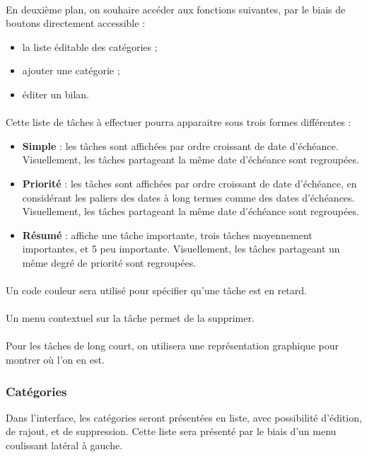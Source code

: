 \documentclass{article}
\begin{document}
			\paragraph{}
			En deuxième plan, on souhaire accéder aux fonctions suivantes, par le biais de boutons directement accessible :
			\begin{itemize}
				\item la liste éditable des catégories ;
				\item ajouter une catégorie ;
				\item éditer un bilan.
			\end{itemize}
			\paragraph{}
			Cette liste de tâches à effectuer pourra apparaitre sous trois formes différentes :

			\begin{itemize}
				\item \textbf{Simple} : les tâches sont affichées par ordre croissant de date d'échéance. Visuellement, les tâches partageant la même date d'échéance sont regroupées.
				\item \textbf{Priorité} : les tâches sont affichées par ordre croissant de date d'échéance, en considérant les paliers des dates à long termes comme des dates d'échéances. Visuellement, les tâches partageant la même date d'échéance sont regroupées.
				\item \textbf{Résumé} : affiche une tâche importante, trois tâches moyennement importantes, et 5 peu importante. Visuellement, les tâches partageant un même degré de priorité sont regroupées.
			\end{itemize}
			\paragraph{}
			Un code couleur sera utilisé pour spécifier qu'une tâche est en retard.
			\paragraph{}
			Un menu contextuel sur la tâche permet de la supprimer.
			\paragraph{}
			Pour les tâches de long court, on utilisera une représentation graphique pour montrer où l'on en est.
		\subsubsection{Catégories}
		Dans l'interface, les catégories seront présentées en liste, avec possibilité d'édition, de rajout, et de suppression. Cette liste sera présenté par le biais d'un menu coulissant latéral à gauche.
\end{document}
